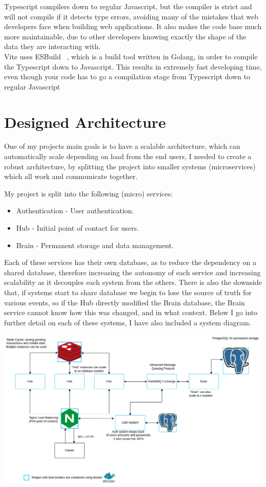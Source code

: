 \documentclass[titlepage]{article}
\begin{document}
Typescript compilers down to regular Javascript, but the compiler is strict and will not compile if it detects type errors, avoiding many of the mistakes that web developers face when building web applications. It also makes the code base much more maintainable, due to other developers knowing exactly the shape of the data they are interacting with. \\

Vite uses ESBuild ~\cite{esbuild}, which is a build tool written in Golang, in order to compile the Typescript down to Javascript. This results in extremely fast developing time, even though your code has to go a compilation stage from Typescript down to regular Javascript \\

\section{Designed Architecture}
One of my projects main goals is to have a scalable architecture, which can automatically scale depending on load from the end users, I needed to create a robust architecture, by splitting the project into smaller systems (microservices) which all work and communicate together.

My project is split into the following (micro) services:
\begin{itemize}
  \item Authentication - User authentication.
  \item Hub - Initial point of contact for users.
  \item Brain - Permanent storage and data management.
\end{itemize}

Each of these services has their own database, as to reduce the dependency on a shared database, therefore increasing the autonomy of each service and increasing scalability as it decouples each system from the others. There is also the downside that, if systems start to share database we begin to lose the source of truth for various events, so if the Hub directly modified the Brain database, the Brain service cannot know how this was changed, and in what context. Below I go into further detail on each of these systems, I have also included a system diagram. 

\hspace*{-3cm}
\includegraphics[width=1.5\textwidth]{Architecture.png}
\end{document}
